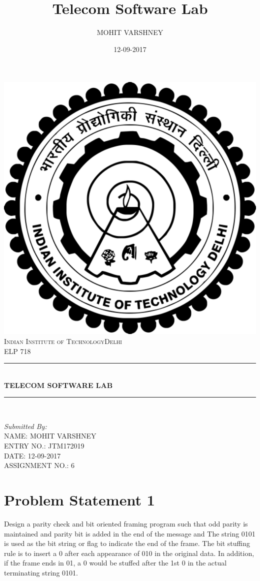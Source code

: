 \documentclass[12pt]{article}
\title{ Telecom Software Lab}
\date{12-09-2017}
\author{MOHIT VARSHNEY}
\begin{document}
\begin{titlepage}

	\begin{center}
    \vspace*{0.5 cm}
    \includegraphics[width=6 cm, height=6 cm]{iitd_logo.png}\\[1.0 cm]
    \textsc{\LARGE Indian Institute of Technology\newline\newline Delhi}
    \\[2.0 cm]                                    	     %
	\textsc{\Large ELP 718}   \\[0.5 cm]				     %
	\rule{\linewidth}{0.2 mm} \\[0.4 cm]
	{ \huge \bfseries {TELECOM SOFTWARE LAB}}\\
	\rule{\linewidth}{0.2 mm} \\[1.5 cm]
	\end{center}
	
	\begin{flushright}    \large
	\emph{Submitted By:}  \\
	NAME: MOHIT VARSHNEY  \\
    ENTRY NO.: JTM172019   \\
    DATE: 12-09-2017       \\
    ASSIGNMENT NO.: 6
	\end{flushright}
			
\end{titlepage}
  
  
\pagebreak
\tableofcontents
\pagebreak

\section{Problem Statement 1}
{
Design a parity check and bit oriented framing program such that odd parity is maintained and parity bit is added in the end of the message and The string 0101 is used as the bit string or flag to indicate the end of the frame. The bit stuffing rule is to insert a 0 after each appearance of 010 in the original data. In addition, if the frame ends in 01, a 0 would be stuffed after the 1st 0 in the actual terminating string 0101.

}
\end{document}
